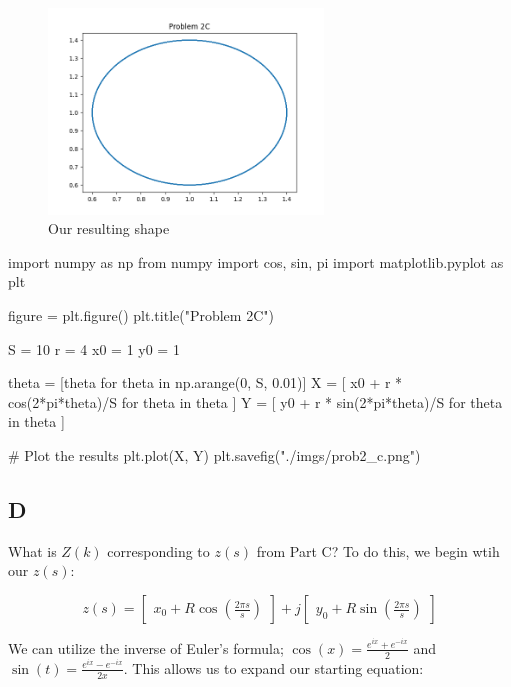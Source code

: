 \documentclass{article}
\begin{document}
\begin{figure}[H]
    \centering
    \includegraphics[width = 0.65\textwidth]{imgs/prob2_c.png}
    \caption{Our resulting shape}
    \label{fig:prob2-c}
\end{figure}

\begin{python}
    import numpy as np
    from numpy import cos, sin, pi
    import matplotlib.pyplot as plt
    
    figure = plt.figure()
    plt.title("Problem 2C")
    
    S = 10
    r = 4
    x0 = 1
    y0 = 1
    
    theta = [theta for theta in np.arange(0, S, 0.01)]
    X = [
            x0 + r * cos(2*pi*theta)/S
            for theta in theta
        ]
    Y = [
            y0 + r * sin(2*pi*theta)/S
            for theta in theta
        ]
    
    # Plot the results
    plt.plot(X, Y)
    plt.savefig("./imgs/prob2_c.png")
\end{python}

\subsection*{D}

What is $Z(k)$ corresponding to $z(s)$ from Part C? To do this, we begin wtih our $z(s)$:

\begin{equation}
    z(s)=\begin{bmatrix}x_0 + R\cos(\frac{2\pi s}{s})\end{bmatrix}+j\begin{bmatrix}y_0 + R \sin(\frac{2\pi s}{s})\end{bmatrix}
\end{equation}

We can utilize the inverse of Euler's formula; $\cos(x)=\frac{e^{ix}+e^{-ix}}{2}$ and $\sin(t) = \frac{e^{ix}-e^{-ix}}{2x}$. This allows us to expand our starting equation:
\end{document}

